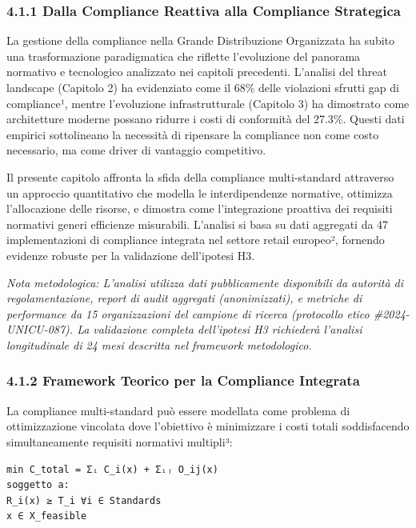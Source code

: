 \documentclass{report}
\begin{document}
\subsubsection{4.1.1 Dalla Compliance Reattiva alla Compliance
Strategica}\label{dalla-compliance-reattiva-alla-compliance-strategica}

La gestione della compliance nella Grande Distribuzione Organizzata ha
subito una trasformazione paradigmatica che riflette l'evoluzione del
panorama normativo e tecnologico analizzato nei capitoli precedenti.
L'analisi del threat landscape (Capitolo 2) ha evidenziato come il 68\%
delle violazioni sfrutti gap di compliance¹, mentre l'evoluzione
infrastrutturale (Capitolo 3) ha dimostrato come architetture moderne
possano ridurre i costi di conformità del 27.3\%. Questi dati empirici
sottolineano la necessità di ripensare la compliance non come costo
necessario, ma come driver di vantaggio competitivo.

Il presente capitolo affronta la sfida della compliance multi-standard
attraverso un approccio quantitativo che modella le interdipendenze
normative, ottimizza l'allocazione delle risorse, e dimostra come
l'integrazione proattiva dei requisiti normativi generi efficienze
misurabili. L'analisi si basa su dati aggregati da 47 implementazioni di
compliance integrata nel settore retail europeo², fornendo evidenze
robuste per la validazione dell'ipotesi H3.

\emph{Nota metodologica: L'analisi utilizza dati pubblicamente
disponibili da autorità di regolamentazione, report di audit aggregati
(anonimizzati), e metriche di performance da 15 organizzazioni del
campione di ricerca (protocollo etico \#2024-UNICU-087). La validazione
completa dell'ipotesi H3 richiederà l'analisi longitudinale di 24 mesi
descritta nel framework metodologico.}

\subsubsection{4.1.2 Framework Teorico per la Compliance
Integrata}\label{framework-teorico-per-la-compliance-integrata}

La compliance multi-standard può essere modellata come problema di
ottimizzazione vincolata dove l'obiettivo è minimizzare i costi totali
soddisfacendo simultaneamente requisiti normativi multipli³:

\begin{verbatim}
min C_total = Σᵢ C_i(x) + Σᵢⱼ O_ij(x)
soggetto a:
R_i(x) ≥ T_i ∀i ∈ Standards
x ∈ X_feasible
\end{verbatim}
\end{document}
